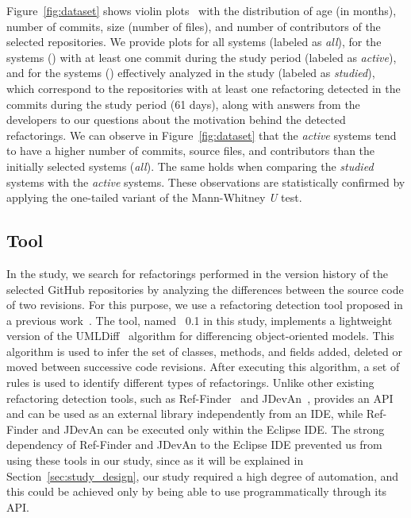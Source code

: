 Figure~\ref{fig:dataset} shows violin plots~\citep{Hintze.Nelson:1998} with the distribution of age (in months), number of commits, size (number of  files), and number of contributors of the selected repositories.
We provide plots for all \totalProjects systems (labeled as \textit{all}), for the \activeProjects systems (\activeProjectsPercentage) with at least one commit during the study period (labeled as \textit{active}),
and for the \studiedProjects systems (\studiedProjectsPercentage) effectively analyzed in the study (labeled as \textit{studied}),
which correspond to the repositories with at least one refactoring detected in the commits during the study period (61 days),
along with answers from the developers to our questions about the motivation behind the detected refactorings.
We can observe in Figure~\ref{fig:dataset} that the \textit{active} systems tend to have a higher number of commits, source files, and contributors than the initially selected systems (\textit{all}).
The same holds when comparing the \textit{studied} systems with the \textit{active} systems.
These observations are statistically confirmed by applying the one-tailed variant of the Mann-Whitney \textit{U} test.








\subsection{\toolName Tool}
\label{study2:tool}

In the study, we search for refactorings performed in the version history of the selected GitHub repositories by analyzing the differences between the source code of two revisions.
For this purpose, we use a refactoring detection tool proposed in a previous work~\citep{tsantalis_empiricalstudy}.
The tool, named \toolName~0.1 in this study, implements a lightweight version of the UMLDiff~\citep{Xing:2005} algorithm for differencing  object-oriented models.
This algorithm is used to infer the set of classes, methods, and fields added, deleted or moved between successive code revisions.
After executing this algorithm, a set of rules is used to identify different types of refactorings.
Unlike other existing refactoring detection tools, such as Ref-Finder~\citep{Kim:2010:RefFinder} and JDevAn~\citep{Xing:2008:JDevAn}, \toolName provides an API and can be used as an external library independently from an IDE,
while Ref-Finder and JDevAn can be executed only within the Eclipse IDE.
The strong dependency of Ref-Finder and JDevAn to the Eclipse IDE prevented us from using these tools in our study,
since as it will be explained in Section~\ref{sec:study_design}, our study required a high degree of automation,
and this could be achieved only by being able to use \toolName programmatically through its API.



